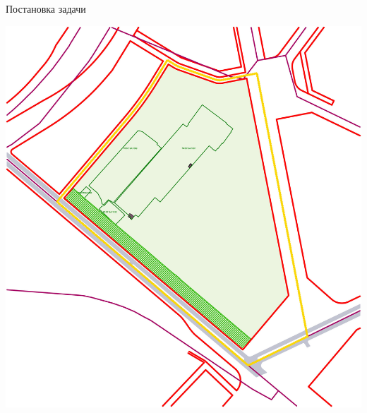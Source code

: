 \documentclass[14pt, fleqn, xcolor={dvipsnames, table}]{beamer}
\begin{document}
\begin{frame}{Постановка задачи}
\begin{center}
                \includegraphics[scale=0.25]{empty.jpg}
            \end{center}                 
        \end{frame}
        
\end{document}
